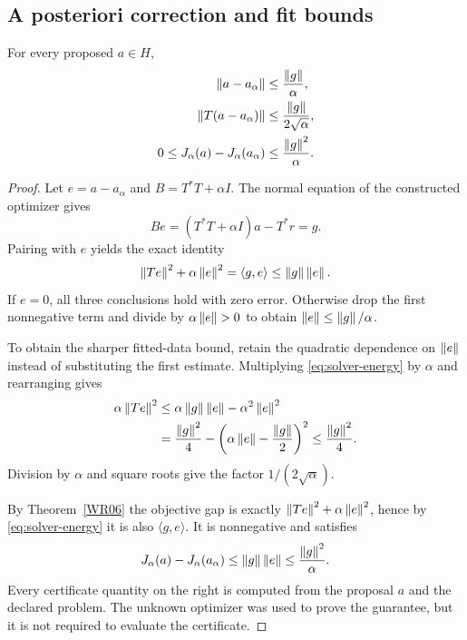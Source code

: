 \subsection{A posteriori correction and fit bounds}
\begin{theorem}\label{WR13}
For every proposed $a\in H$,
\begin{align}
 \left\lVert a-a_\alpha\right\rVert&\le\frac{\left\lVert g\right\rVert}{\alpha},\label{eq:solver-error}\\
 \left\lVert T(a-a_\alpha)\right\rVert&\le\frac{\left\lVert g\right\rVert}{2\sqrt\alpha},\label{eq:solver-fit}\\
 0\le J_\alpha(a)-J_\alpha(a_\alpha)&\le\frac{\left\lVert g\right\rVert^2}{\alpha}.
 \label{eq:solver-objective}
\end{align}
\end{theorem}
\begin{proof}
Let $e=a-a_\alpha$ and $B=T^*T+\alpha I$. The normal equation of the constructed optimizer gives
\[
 Be=(T^*T+\alpha I)a-T^*r=g.
\]
Pairing with $e$ yields the exact identity
\begin{equation}\label{eq:solver-energy}
 \left\lVert Te\right\rVert^2+\alpha\left\lVert e\right\rVert^2=\langle g,e\rangle
 \le\left\lVert g\right\rVert\left\lVert e\right\rVert.
\end{equation}
If $e=0$, all three conclusions hold with zero error. Otherwise drop the first nonnegative term and divide by $\alpha\left\lVert e\right\rVert>0$ to obtain $\left\lVert e\right\rVert\le\left\lVert g\right\rVert/\alpha$.

To obtain the sharper fitted-data bound, retain the quadratic dependence on $\left\lVert e\right\rVert$ instead of substituting the first estimate. Multiplying \eqref{eq:solver-energy} by $\alpha$ and rearranging gives
\[
\begin{aligned}
 \alpha\left\lVert Te\right\rVert^2
 &\le\alpha\left\lVert g\right\rVert\left\lVert e\right\rVert-\alpha^2\left\lVert e\right\rVert^2\\
 &=\frac{\left\lVert g\right\rVert^2}{4}
     -\left(\alpha\left\lVert e\right\rVert-\frac{\left\lVert g\right\rVert}{2}\right)^2
 \le\frac{\left\lVert g\right\rVert^2}{4}.
\end{aligned}
\]
Division by $\alpha$ and square roots give the factor $1/(2\sqrt\alpha)$.

By Theorem~\ref{WR06} the objective gap is exactly $\left\lVert Te\right\rVert^2+\alpha\left\lVert e\right\rVert^2$, hence by \eqref{eq:solver-energy} it is also $\langle g,e\rangle$. It is nonnegative and satisfies
\[
 J_\alpha(a)-J_\alpha(a_\alpha)
 \le\left\lVert g\right\rVert\left\lVert e\right\rVert\le\frac{\left\lVert g\right\rVert^2}{\alpha}.
\]
Every certificate quantity on the right is computed from the proposal $a$ and the declared problem. The unknown optimizer was used to prove the guarantee, but it is not required to evaluate the certificate.
\end{proof}

